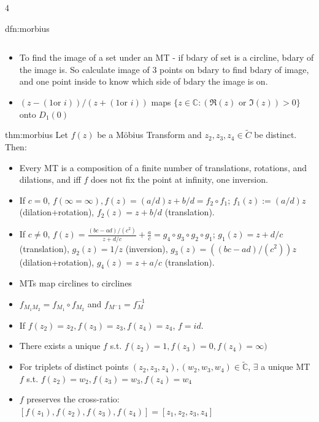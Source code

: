 \documentclass[landscape, 8pt]{extarticle}
\begin{document}
\begin{multicols*}{4}
\begin{dfn}{dfn:morbius}{ }
\begin{tabular}{|c|c|c|c|}
			\end{tabular}
		\begin{itemize}
			\item To find the image of a set under an MT - if bdary of set is a circline, bdary of the image is. So calculate image of 3 points on bdary to find bdary of image, and one point inside to know which side of bdary the image is on.
			\item $(z-(1 \text{or } i))/(z+(1 \text{or } i))$ maps $\{z\in \mathbb{C} : (\Re(z) \text{ or } \Im(z)) > 0\}$ onto $D_1(0)$
		\end{itemize}
		
	\end{dfn}
	
	
	\begin{thm}{thm:morbius}{ }
		Let $f(z)$ be a M{\"o}bius Transform and $z_2, z_3, z_4 \in \tilde{C}$ be distinct. Then:
		\begin{itemize}
			\item Every MT is a composition of a finite number of translations, rotations, and dilations, and iff $f$ does not fix the point at infinity, one inversion.
			\item If $c = 0$, $f(\infty = \infty), f(z) = (a/d)z + b/d = f_2 \circ f_1$; $f_1(z) := (a/d)z$ (dilation+rotation), $f_2(z) = z + b/d$ (translation).
			\item If $c \ne 0$, $f(z) = \frac{(bc-ad)/(c^2)}{z + d/c} + \frac{a}{c} = g_4 \circ g_3 \circ g_2 \circ g_1$; $g_1(z) = z + d/c$ (translation), $g_2(z) = 1/z$ (inversion), $g_3(z) = ((bc-ad)/(c^2))z$ (dilation+rotation), $g_4(z) = z+ a/c$ (translation).
			\item MTs map circlines to circlines
			\item $f_{M_1 M_2} = f_{M_1} \circ f_{M_2}$ and $f_{M^-1} = f_M^{-1}$
			\item If $f(z_2) = z_2, f(z_3) = z_3, f(z_4) = z_4$, $f = id$.
			\item There exists a unique $f$ s.t. $f(z_2) = 1, f(z_3) = 0, f(z_4) = \infty)$
			\item For triplets of distinct points $(z_2, z_3, z_4), (w_2, w_3, w_4) \in \tilde{\mathbb{C}}$, $\exists$ a unique MT $f$ s.t. $f(z_2) = w_2, f(z_3) = w_3, f(z_4) = w_4$
			\item $f$ preserves the cross-ratio: $[f(z_1), f(z_2), f(z_3), f(z_4)] = [z_1, z_2, z_3, z_4]$
			
		\end{itemize}
		

\end{thm}
\end{multicols*}
\end{document}
